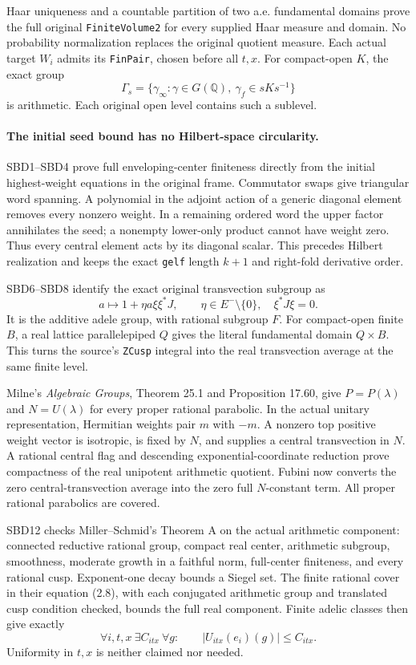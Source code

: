 Haar uniqueness and a countable partition of two a.e. fundamental
domains prove the full original \texttt{FiniteVolume2} for every
supplied Haar measure and domain. No probability normalization
replaces the original quotient measure. Each actual target
$W_i$ admits its \texttt{FinPair}, chosen before all $t,x$.
For compact-open $K$, the exact group
\[
 \Gamma_s=\{\gamma_\infty:\gamma\in G(\mathbb Q),\
                         \gamma_f\in sKs^{-1}\}
\]
is arithmetic. Each original open level contains such a sublevel.

\paragraph{The initial seed bound has no Hilbert-space circularity.}
SBD1--SBD4 prove full enveloping-center finiteness directly from
the initial highest-weight equations in the original frame.
Commutator swaps give triangular word spanning. A polynomial in
the adjoint action of a generic diagonal element removes every
nonzero weight. In a remaining ordered word the upper factor
annihilates the seed; a nonempty lower-only product cannot have
weight zero. Thus every central element acts by its diagonal
scalar. This precedes Hilbert realization and keeps the exact
\texttt{gelf} length $k+1$ and right-fold derivative order.

SBD6--SBD8 identify the exact original transvection subgroup as
\[
 a\longmapsto 1+\eta a\xi\xi^*J,\qquad
 \eta\in E^{-}\setminus\{0\},\quad \xi^*J\xi=0.
\]
It is the additive adele group, with rational subgroup $F$.
For compact-open finite $B$, a real lattice parallelepiped $Q$
gives the literal fundamental domain $Q\times B$. This turns
the source's \texttt{ZCusp} integral into the real transvection
average at the same finite level.

Milne's \emph{Algebraic Groups}, Theorem 25.1 and Proposition
17.60, give $P=P(\lambda)$ and $N=U(\lambda)$ for every proper
rational parabolic. In the actual unitary representation,
Hermitian weights pair $m$ with $-m$. A nonzero top positive
weight vector is isotropic, is fixed by $N$, and supplies a
central transvection in $N$. A rational central flag and
descending exponential-coordinate reduction prove compactness
of the real unipotent arithmetic quotient. Fubini now converts
the zero central-transvection average into the zero full
$N$-constant term. All proper rational parabolics are covered.

SBD12 checks Miller--Schmid's Theorem A on the actual arithmetic
component: connected reductive rational group, compact real
center, arithmetic subgroup, smoothness, moderate growth in a
faithful norm, full-center finiteness, and every rational cusp.
Exponent-one decay bounds a Siegel set. The finite rational
cover in their equation (2.8), with each conjugated arithmetic
group and translated cusp condition checked, bounds the full
real component. Finite adelic classes then give exactly
\[
 \forall i,t,x\ \exists C_{itx}\ \forall g:\qquad
             |U_{itx}(e_i)(g)|\le C_{itx}.
\]
Uniformity in $t,x$ is neither claimed nor needed.

